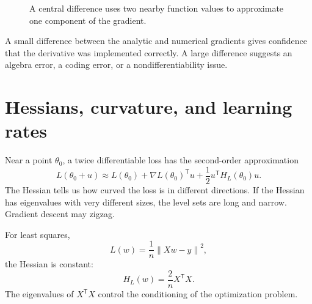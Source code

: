 \documentclass[11pt,oneside]{book}
\newcommand{\grad}{\nabla}
\newcommand{\norm}[1]{\left\lVert #1\right\rVert}
\newcommand{\T}{^{\mathsf T}}
\begin{document}
\begin{figure}[H]
\centering
{}
\caption{A central difference uses two nearby function values to approximate one component of the gradient.}
\end{figure}

A small difference between the analytic and numerical gradients gives confidence that the derivative was implemented correctly. A large difference suggests an algebra error, a coding error, or a nondifferentiability issue.

\section{Hessians, curvature, and learning rates}

Near a point $\theta_0$, a twice differentiable loss has the second-order approximation
\[
L(\theta_0+u)\approx L(\theta_0)+\grad L(\theta_0)\T u+\frac12 u\T H_L(\theta_0)u.
\]
The Hessian tells us how curved the loss is in different directions. If the Hessian has eigenvalues with very different sizes, the level sets are long and narrow. Gradient descent may zigzag.

For least squares,
\[
L(w)=\frac1n\norm{Xw-y}^2,
\]
the Hessian is constant:
\[
H_L(w)=\frac2n X\T X.
\]
The eigenvalues of $X\T X$ control the conditioning of the optimization problem.
\end{document}
